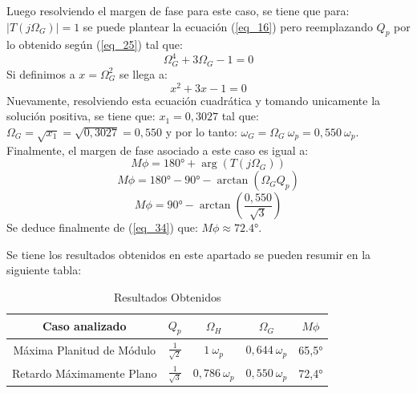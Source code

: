 \documentclass[12pt,a4paper]{article}
\begin{document}
\begin{itemize}
    Luego resolviendo el margen de fase para este caso, se tiene que para: $|T(j\Omega_{G})| = 1$ se puede plantear la ecuación (\ref{eq_16}) pero reemplazando $Q_{p}$ por lo obtenido según (\ref{eq_25}) tal que:
    \begin{equation}
        \label{eq_30}
        \Omega_{G}^{4} + 3\Omega_{G} - 1 = 0
    \end{equation}
    Si definimos a $x=\Omega_{G}^{2}$ se llega a:
    \begin{equation}
        \label{eq_31}
        x^{2} + 3x - 1 = 0
    \end{equation}
    Nuevamente, resolviendo esta ecuación cuadrática y tomando unicamente la solución positiva, se tiene que: $x_{1} = 0,3027$ tal que: $\Omega_{G} = \sqrt{x_{1}} = \sqrt{0,3027} = 0,550$ y por lo tanto: $\omega_{G} = \Omega_{G} \ \omega_{p} = 0,550 \ \omega_{p}$. Finalmente, el margen de fase asociado a este caso es igual a:
    \begin{equation}
        \label{eq_32}
        M\phi = \ang{180} + \arg(T(j\Omega_{G}))
    \end{equation}
    \begin{equation}
        \label{eq_33}
        M\phi = \ang{180} - \ang{90} - \arctan(\Omega_{G} Q_{p})  
    \end{equation}
    \begin{equation}
        \label{eq_34}
        M\phi = \ang{90} - \arctan\left(\frac{0,550}{\sqrt{3}}\right) 
    \end{equation}
    Se deduce finalmente de (\ref{eq_34}) que: $M\phi \approx \ang{72,4}$.    
\end{itemize}

Se tiene los resultados obtenidos en este apartado se pueden resumir en la siguiente tabla:

\begin{table}[H]
    \begin{center}
    \begin{tabular}{| c | c | c | c | c |}
        \hline
        Caso analizado & $Q_{p}$ & $\Omega_{H}$ & $\Omega_{G}$ & $M\phi$ \\ \hline
        Máxima Planitud de Módulo & $\frac{1}{\sqrt{2}}$ & $1 \ \omega_{p}$ & $0,644 \ \omega_{p}$ & \ang{65,5} \\ \hline
        Retardo Máximamente Plano & $\frac{1}{\sqrt{3}}$ & $0,786 \ \omega_{p} $ & $0,550 \ \omega_{p}$ & \ang{72,4} \\ \hline
    \end{tabular}
    \caption{Resultados Obtenidos}
    \label{tab:tb_1}
    \end{center}
\end{table}
\end{document}
